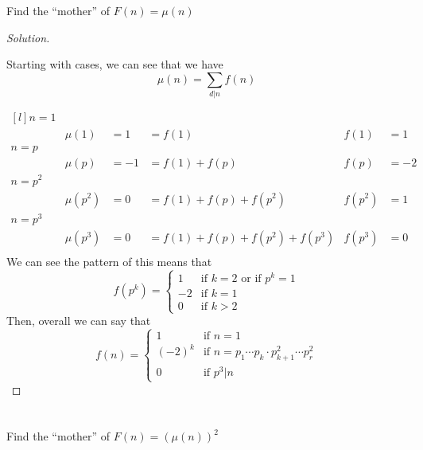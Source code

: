 \documentclass[11pt]{article}
\newenvironment{myproblem}[1][Problem]{\begin{trivlist}
    \item[\hskip \labelsep {\bfseries #1.}]}{\end{trivlist}}
\newenvironment{solution}
  {\renewcommand\qedsymbol{$~$}\begin{proof}[Solution]$ $\par\nobreak\ignorespaces}
  {\end{proof}}
\begin{document}
\section{}
\begin{myproblem}
  Find the ``mother'' of $F(n)=\mu(n)$
\end{myproblem}

\begin{solution}
  Starting with cases, we can see that we have
  \[
    \mu(n) = \sum_{d|n} f(n)
  \]

  \[
    \begin{matrix*}[l]
      n=1                                                                \\
      & \mu(1)   & = 1  & = f(1)                        & f(1)   & =1   \\
      n=p                                                                \\
      & \mu(p)   & = -1 & = f(1)+f(p)                   & f(p)   & = -2 \\
      n=p^2                                                              \\
      & \mu(p^2) & = 0  & = f(1)+f(p) + f(p^2)          & f(p^2) & = 1  \\
      n=p^3                                                              \\
      & \mu(p^3) & = 0  & = f(1)+f(p) + f(p^2) + f(p^3) & f(p^3) & = 0  \\
    \end{matrix*}
  \]
  We can see the pattern of this means that
  \[
    f(p^k)=\begin{cases}
      1  & \text{if $k=2$ or if $p^k=1$} \\
      -2 & \text{if $k=1$}               \\
      0  & \text{if $k>2$}
    \end{cases}
  \]
  Then, overall we can say that
  \[
    f(n)=\begin{cases}
      1      & \text{if $n=1$}                                          \\
      (-2)^k & \text{if $n=p_1\cdots p_k \cdot p_{k+1}^2 \cdots p_r^2$} \\
      0      & \text{if $p^3|n$}
    \end{cases}
  \]
\end{solution}



\section{}
\begin{myproblem}
  Find the ``mother'' of $F(n)=(\mu(n))^2$
\end{myproblem}
\end{document}
